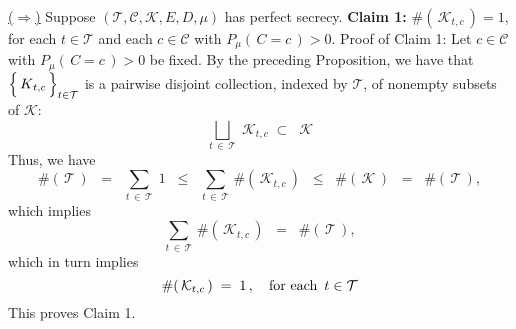 \vskip 1.0cm
\noindent
\underline{($\Longrightarrow$)}
\vskip 0.2cm
\noindent
Suppose $(\mathcal{T},\mathcal{C},\mathcal{K},E,D,\mu)$ has perfect secrecy.
\vskip 0.3cm
\noindent
\textbf{Claim 1:}\quad
$\#\!\left(\,\mathcal{K}_{t,c}\,\right) = 1$, for each $t \in \mathcal{T}$ and each $c \in \mathcal{C}$ with
$P_{\mu}\!\left(\,C=c\,\right) > 0$.
\vskip 0.2cm
\noindent
Proof of Claim 1:\quad
Let $c \in \mathcal{C}$ with $P_{\mu}\!\left(\,C=c\,\right) > 0$ be fixed.
By the preceding Proposition, we have that
$\left\{\,\overset{{\color{white}.}}{K}_{t,c}\,\right\}_{t\in\mathcal{T}}$
is a pairwise disjoint collection, indexed by $\mathcal{T}$, of nonempty subsets of $\mathcal{K}$:
\begin{equation*}
\underset{t\,\in\,\mathcal{T}}{\bigsqcup}\; \mathcal{K}_{t,c}
\; \subset \;\;
\mathcal{K}
\end{equation*}
Thus, we have
\begin{equation*}
\#\!\left(\,\mathcal{T}\,\right)
\;\; = \;\;
	\underset{t\,\in\,\mathcal{T}}{\sum}\; 1
\;\; \leq \;\;
	\underset{t\,\in\,\mathcal{T}}{\sum}\, \#\!\left(\,\mathcal{K}_{t,c}\,\right)
\;\; \leq \;\;
	\#\!\left(\,\mathcal{K}\,\right)
\;\; = \;\;
	\#\!\left(\,\mathcal{T}\,\right),
\end{equation*}
which implies
\begin{equation*}
\underset{t\,\in\,\mathcal{T}}{\sum}\, \#\!\left(\,\mathcal{K}_{t,c}\,\right)
\;\; = \;\;
	\#\!\left(\,\mathcal{T}\,\right),
\end{equation*}
which in turn implies
\begin{equation*}
\#\!\left(\,\mathcal{K}_{t,c}\,\right) \; = \; 1\,,
\quad
\textnormal{for each \,$t \in \mathcal{T}$}
\end{equation*}
This proves Claim 1.

